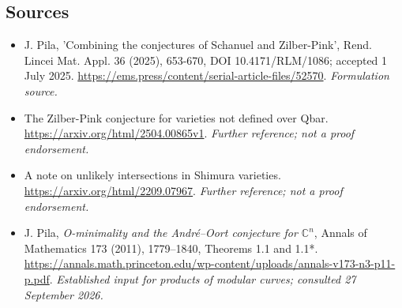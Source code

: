 \documentclass[11pt]{article}
\begin{document}
\subsection{Sources}
\begin{itemize}
\item[S1]J. Pila, 'Combining the conjectures of Schanuel and Zilber-Pink', Rend. Lincei Mat. Appl. 36 (2025), 653-670, DOI 10.4171/RLM/1086; accepted 1 July 2025.
\url{https://ems.press/content/serial-article-files/52570}.
\textit{Formulation source.}
\item[S2]The Zilber-Pink conjecture for varieties not defined over Qbar.
\url{https://arxiv.org/html/2504.00865v1}.
\textit{Further reference; not a proof endorsement.}
\item[S3]A note on unlikely intersections in Shimura varieties.
\url{https://arxiv.org/html/2209.07967}.
\textit{Further reference; not a proof endorsement.}
\item[E1]J. Pila, \emph{O-minimality and the Andr\'e--Oort conjecture for $\mathbb C^n$}, Annals of Mathematics 173 (2011), 1779--1840, Theorems 1.1 and 1.1*.
\url{https://annals.math.princeton.edu/wp-content/uploads/annals-v173-n3-p11-p.pdf}.
\textit{Established input for products of modular curves; consulted 27 September 2026.}
\end{itemize}
\end{document}
